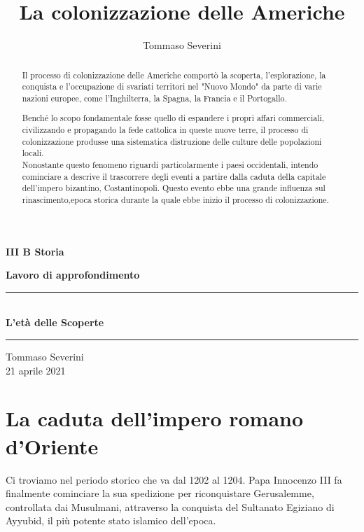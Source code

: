 \documentclass[11pt]{report}
\title{La colonizzazione delle Americhe}
\author{Tommaso Severini}
\begin{document}
	

	
	
	\begin{titlepage}
		\begin{center}
			\Large\textbf{ III B Storia}
			
			\Large\textbf{Lavoro di approfondimento}
			\vfill
			\rule{400pt}{0.1pt}\\
			
			\huge\textbf{L'età delle Scoperte}
			\rule{400pt}{0.1pt}
			\vfill
			{\small Tommaso Severini\\
			21 aprile 2021}
		\end{center}
	\end{titlepage}	
	
	\begin{abstract}
		Il processo di colonizzazione delle Americhe comportò la scoperta, l'esplorazione, la conquista e l'occupazione di svariati territori nel "Nuovo Mondo" da parte di varie nazioni europee, come l'Inghilterra, la Spagna, la Francia e il Portogallo. 
		
		Benché lo scopo fondamentale fosse quello di espandere i propri affari commerciali, civilizzando e propagando la fede cattolica in queste nuove terre, il processo di colonizzazione produsse una sistematica distruzione delle culture delle popolazioni locali.\\
		
		Nonostante questo fenomeno riguardi particolarmente i paesi occidentali, intendo cominciare a descrive il trascorrere degli eventi a partire dalla caduta della capitale dell'impero bizantino, Costantinopoli. Questo evento ebbe una grande influenza sul rinascimento,epoca storica durante la quale ebbe inizio il processo di colonizzazione.
	\end{abstract}
	
	\chapter{La caduta dell'impero romano d'Oriente}
	
	Ci troviamo nel periodo storico che va dal 1202 al 1204. Papa Innocenzo III fa finalmente cominciare la sua spedizione per riconquistare Gerusalemme, controllata dai Musulmani, attraverso la conquista del Sultanato Egiziano di Ayyubid, il più potente stato islamico dell'epoca. 
	
\end{document}

